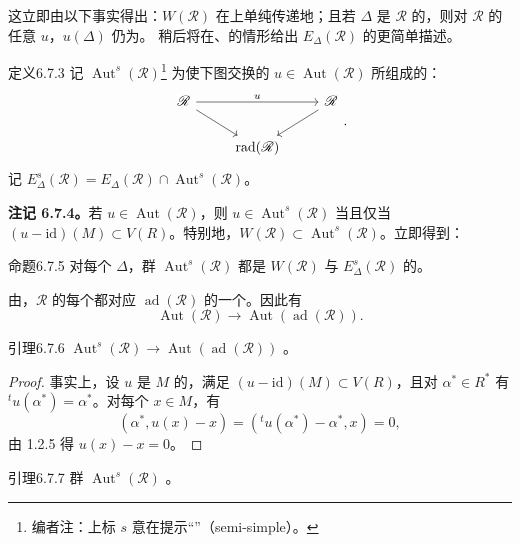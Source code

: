 这立即由以下事实得出：$W(\mathscr R)$ 在上单纯传递地；且若 $\Delta$ 是 $\mathscr R$ 的，则对 $\mathscr R$ 的任意 $u$，$u(\Delta)$ 仍为。
稍后将在、的情形给出 $E_\Delta(\mathscr R)$ 的更简单描述。
\begin{SGAresult}{定义}{6.7.3}
记 $\operatorname{Aut}^s(\mathscr R)$\footnote{编者注：上标 $s$ 意在提示“”（semi-simple）。} 为使下图交换的 $u\in\operatorname{Aut}(\mathscr R)$ 所组成的：
\[\begin{tikzcd}
\mathscr R\arrow[rr,"u"]\arrow[dr]&&\mathscr R\arrow[dl]\\
&\operatorname{rad}(\mathscr R)&
\end{tikzcd}.\]
记 $E_\Delta^s(\mathscr R)=E_\Delta(\mathscr R)\cap\operatorname{Aut}^s(\mathscr R)$。
\end{SGAresult}
\textbf{注记 6.7.4。}若 $u\in\operatorname{Aut}(\mathscr R)$，则 $u\in\operatorname{Aut}^s(\mathscr R)$ 当且仅当 $(u-\mathrm{id})(M)\subset V(R)$。特别地，$W(\mathscr R)\subset\operatorname{Aut}^s(\mathscr R)$。立即得到：
\begin{SGAresult}{命题}{6.7.5}
对每个 $\Delta$，群 $\operatorname{Aut}^s(\mathscr R)$ 都是 $W(\mathscr R)$ 与 $E_\Delta^s(\mathscr R)$ 的。
\end{SGAresult}
由，$\mathscr R$ 的每个都对应 $\operatorname{ad}(\mathscr R)$ 的一个。因此有
\[\operatorname{Aut}(\mathscr R)\longrightarrow\operatorname{Aut}(\operatorname{ad}(\mathscr R)).\]
\begin{SGAresult}{引理}{6.7.6}
 $\operatorname{Aut}^s(\mathscr R)\to\operatorname{Aut}(\operatorname{ad}(\mathscr R))$ 。
\end{SGAresult}
\begin{proof}
事实上，设 $u$ 是 $M$ 的，满足 $(u-\mathrm{id})(M)\subset V(R)$，且对 $\alpha^*\in R^*$ 有 ${}^tu(\alpha^*)=\alpha^*$。对每个 $x\in M$，有
\[(\alpha^*,u(x)-x)=({}^tu(\alpha^*)-\alpha^*,x)=0,\]
由 1.2.5 得 $u(x)-x=0$。
\end{proof}
\begin{SGAresult}{引理}{6.7.7}
群 $\operatorname{Aut}^s(\mathscr R)$ 。
\end{SGAresult}
